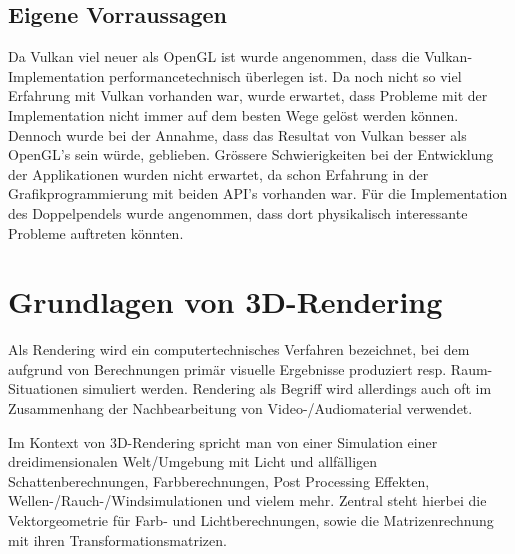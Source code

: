 \documentclass[titlepage, 11pt, a4paper, ngerman]{article}
\begin{document}
\subsection{Eigene Vorraussagen}
Da Vulkan viel neuer als OpenGL ist wurde angenommen, dass die Vulkan-Implementation performancetechnisch überlegen ist. Da noch nicht so viel Erfahrung mit Vulkan vorhanden war, wurde erwartet, dass Probleme mit der Implementation nicht immer auf dem besten Wege gelöst werden können. Dennoch wurde bei der Annahme, dass das Resultat von Vulkan besser als OpenGL's sein würde, geblieben. Grössere Schwierigkeiten bei der Entwicklung der Applikationen wurden nicht erwartet, da schon Erfahrung in der Grafikprogrammierung mit beiden \acrshort{API}'s vorhanden war. Für die Implementation des Doppelpendels wurde angenommen, dass dort physikalisch interessante Probleme auftreten könnten.


\newpage
\section{Grundlagen von 3D-Rendering}
Als \gls{Rendering} wird ein computertechnisches Verfahren bezeichnet, bei dem aufgrund von Berechnungen primär visuelle Ergebnisse produziert resp. Raum-Situationen simuliert werden. \gls{Rendering} als Begriff wird allerdings auch oft im Zusammenhang der Nachbearbeitung von Video-/Audiomaterial verwendet.\par Im Kontext von 3D-\gls{Rendering} spricht man von einer Simulation einer dreidimensionalen Welt/Umgebung mit Licht und allfälligen Schattenberechnungen, Farbberechnungen, Post Processing Effekten, Wellen-/Rauch-/Windsimulationen und vielem mehr. Zentral steht hierbei die Vektorgeometrie für Farb- und Lichtberechnungen, sowie die Matrizenrechnung mit ihren Transformationsmatrizen.
\end{document}
